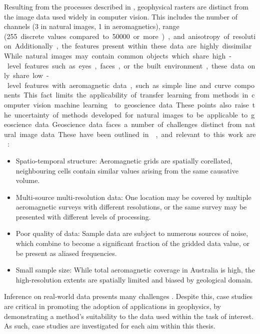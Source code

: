 Resulting from the processes described in , geophysical rasters are distinct from the image data used widely in computer vision.
This includes the number of channels (3 in natural images, 1 in aeromagnetics), range (\qty{255} discrete values compared to \qty{50000} or more), and anisotropy of resolution.
Additionally, the features present within these data are highly dissimilar.
While natural images may contain common objects which share high-level features such as eyes, faces, or the built environment, these data only share low-level features with aeromagnetic data, such as simple line and curve components.
This fact limits the applicability of transfer learning from methods in computer vision machine learning \parencite{tanSurveyDeepTransfer2018} to geoscience data.
These points also raise the uncertainty of methods developed for natural images to be  applicable to geoscience data.

Geoscience data faces a number of challenges distinct from natural image data. These have been outlined in \textcite{karpatneMachineLearningGeosciences2019}, and relevant to this work are:
\begin{itemize}
    \item{} Spatio-temporal structure: Aeromagnetic grids are spatially corellated, neighbouring cells contain similar values arising from the same causative volume.
    \item{} Multi-source multi-resolution data: One location may be covered by multiple aeromagnetic surveys with different resolutions, or the same survey may be presented with different levels of processing.
    \item{} Poor quality of data: Sample data are subject to numerous sources of noise, which combine to become a significant fraction of the gridded data value, or be present as aliased frequencies.
    \item{} Small sample size: While total aeromagnetic coverage in Australia is high, the high-resolution extents are spatially limited and biased by geological domain.
\end{itemize}

Inference on real-world data presents many challenges \parencite{nikolenkoSyntheticDataDeep2021,tremblayTrainingDeepNetworks2018}.
Despite this, case studies are critical in promoting the adoption of applications in geophysics, by demonstrating a method's suitability to the data used within the task of interest.
As such, case studies are investigated for each aim within this thesis.

